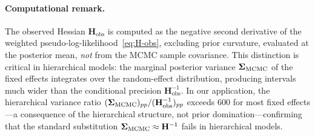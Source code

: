 \paragraph{Computational remark.}
The observed Hessian $\mathbf{H}_{\mathrm{obs}}$ is computed as the negative
second derivative of the weighted pseudo-log-likelihood~\eqref{eq:H-obs},
excluding prior curvature, evaluated at the posterior mean,
\emph{not} from the MCMC sample covariance. This distinction is critical in
hierarchical models: the marginal posterior variance
$\boldsymbol{\Sigma}_{\mathrm{MCMC}}$ of the fixed effects integrates over the
random-effect distribution, producing intervals much wider than the
conditional precision $\mathbf{H}_{\mathrm{obs}}^{-1}$. In our
application, the hierarchical variance ratio
$(\boldsymbol{\Sigma}_{\mathrm{MCMC}})_{pp}/(\mathbf{H}_{\mathrm{obs}}^{-1})_{pp}$
exceeds 600 for most fixed effects---a consequence of the hierarchical
structure, not prior domination---confirming that the standard substitution
$\boldsymbol{\Sigma}_{\mathrm{MCMC}} \approx \mathbf{H}^{-1}$ fails in hierarchical
models.

